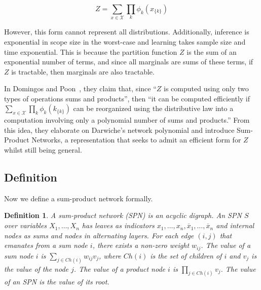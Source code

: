 \documentclass[a4paper,10pt]{article}
\theoremstyle{plain}
\newtheorem*{spn-def}{Definition}
\begin{document}
\begin{equation*}
  Z = \sum_{x\in \mathcal{X}} \prod_k \phi_k(x_{\{k\}})
\end{equation*}

However, this form cannot represent all distributions. Additionally, inference is exponential in
scope size in the worst-case and learning takes sample size and time exponential. This is because
the partition function $Z$ is the sum of an exponential number of terms, and since all marginals
are sums of these terms, if $Z$ is tractable, then marginals are also tractable.

In Domingos and Poon~\cite{poon-domingos}, they claim that, since ``$Z$ is computed using only two
types of operations sums and products'', then ``it can be computed efficiently if $\sum_{x\in
\mathcal{X}} \prod_k \phi_k (k_{\{k\}})$ can be reorganized using the distributive law into a
computation involving only a polynomial number of sums and products.'' From this idea, they
elaborate on Darwiche's network polynomial and introduce Sum-Product Networks, a representation
that seeks to admit an efficient form for $Z$ whilst still being general.

\subsection{Definition}

Now we define a sum-product network formally.

\begin{spn-def}
  A sum-product network (SPN) is an acyclic digraph. An SPN $S$ over variables $X_1,\ldots,X_n$ has
  leaves as indicators $x_1,\ldots,x_n,\overline{x}_1,\ldots,\overline{x}_n$ and internal nodes as
  sums and nodes in alternating layers. For each edge $(i,j)$ that emanates from a sum node $i$,
  there exists a non-zero weight $w_{ij}$. The value of a sum node $i$ is $\sum_{j\in Ch(i)}
  w_{ij}v_j$, where $Ch(i)$ is the set of children of $i$ and $v_j$ is the value of the node $j$.
  The value of a product node $i$ is $\prod_{j\in Ch(i)} v_j$. The value of an SPN is the value of
  its root.
\end{spn-def}
\end{document}

